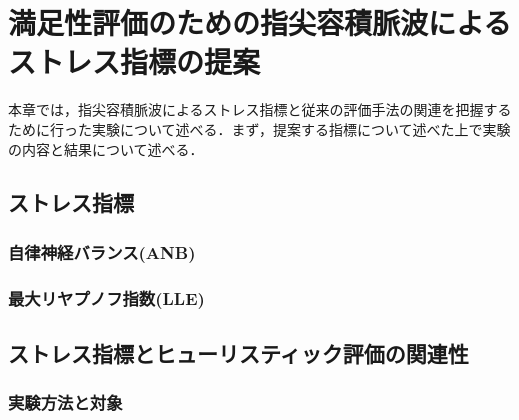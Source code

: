 \chapter{満足性評価のための指尖容積脈波によるストレス指標の提案}
\label{chap:pulsewave}

本章では，指尖容積脈波によるストレス指標と従来の評価手法の関連を把握するために行った実験について述べる．まず，提案する指標について述べた上で実験の内容と結果について述べる．

\section{ストレス指標}

\subsection{自律神経バランス(ANB)}

\subsection{最大リヤプノフ指数(LLE)}

\section{ストレス指標とヒューリスティック評価の関連性}

\subsection{実験方法と対象}

